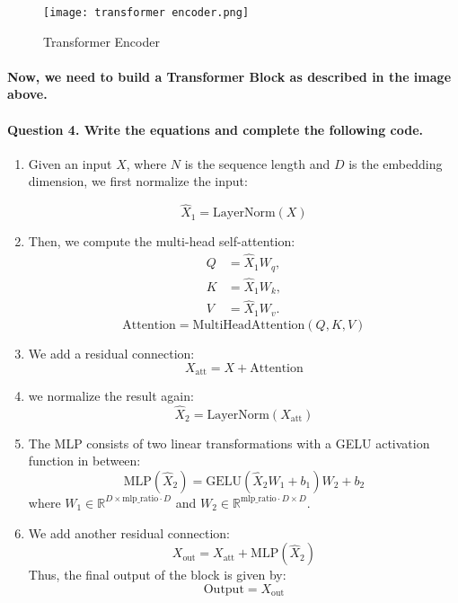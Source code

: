 \documentclass{article}
\begin{document}
\begin{figure}[H]
    \centering
    \texttt{[image: transformer encoder.png]}
    \caption{Transformer Encoder}
\end{figure}
\paragraph{Now, we need to build a Transformer \textbf{Block} as described in the image above.
 }
 \paragraph{Question 4. Write the equations and complete the following code.}


\begin{enumerate}
       \item Given an input $X$, where \( N \) is the sequence length and \( D \) is the embedding dimension, we first normalize the input:
  
   \[
   \hat{X}_1 = \text{LayerNorm}(X)
   \]
   \item Then, we compute the multi-head self-attention:
   \begin{align*}
    Q & = \hat{X}_1 W_q,  \\
    K & = \hat{X}_1 W_k, \\
    V & = \hat{X}_1 W_v.
\end{align*}
   \[
   \text{Attention} = \text{MultiHeadAttention}(Q,K,V)
   \]
   \item We add a residual connection:
   \[
   X_{\text{att}} = X + \text{Attention}
   \]
 


    \item we normalize the result again:
    \[
   \hat{X}_2 = \text{LayerNorm}(X_{\text{att}})
   \]
   \item The MLP consists of two linear transformations with a GELU activation function in between:
   \[
   \text{MLP}(\hat{X}_2) = \text{GELU}(\hat{X}_2 W_1 + b_1) W_2 + b_2
   \]
   where \( W_1 \in \mathbb{R}^{D \times \text{mlp\_ratio} \cdot D} \) and \( W_2 \in \mathbb{R}^{\text{mlp\_ratio} \cdot D \times D} \).

   \item We add another residual connection:
    \[
   X_{\text{out}} = X_{\text{att}} + \text{MLP}(\hat{X}_2)
   \]
Thus, the final output of the block is given by:
\[
\text{Output} = X_{\text{out}}
\]


    
\end{enumerate}
\end{document}
